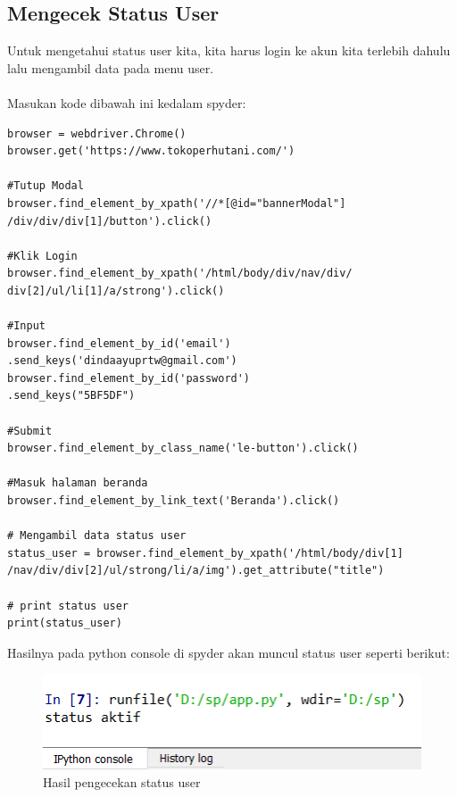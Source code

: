 \subsection{Mengecek Status User}
Untuk mengetahui status user kita, kita harus login ke akun kita terlebih dahulu lalu mengambil data pada menu user.
\\\\
Masukan kode dibawah ini kedalam spyder:
\begin{verbatim}
browser = webdriver.Chrome()
browser.get('https://www.tokoperhutani.com/')

#Tutup Modal
browser.find_element_by_xpath('//*[@id="bannerModal"]
/div/div/div[1]/button').click()

#Klik Login
browser.find_element_by_xpath('/html/body/div/nav/div/
div[2]/ul/li[1]/a/strong').click()

#Input 
browser.find_element_by_id('email')
.send_keys('dindaayuprtw@gmail.com')
browser.find_element_by_id('password')
.send_keys("5BF5DF")

#Submit
browser.find_element_by_class_name('le-button').click()

#Masuk halaman beranda
browser.find_element_by_link_text('Beranda').click()

# Mengambil data status user
status_user = browser.find_element_by_xpath('/html/body/div[1]
/nav/div/div[2]/ul/strong/li/a/img').get_attribute("title")

# print status user
print(status_user)
\end{verbatim}

\newpage
Hasilnya pada python console di spyder akan muncul status user seperti berikut:
\begin{figure}[h]
	\centering
	\includegraphics[scale=0.7]{figures/9StatusUser}
	\caption{Hasil pengecekan status user}
\end{figure}

\newpage
